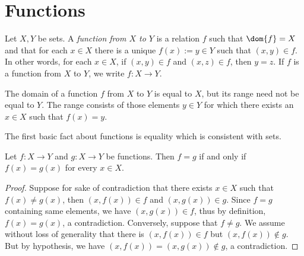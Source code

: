 \section{Functions}
\begin{comment}
\begin{definition}[Functions]
    Let $X, Y$ be sets, and let $P(x, y)$ be a property pertaining to an object $x \in X$ and an object $y \in Y$, such that for every $x \in X$, there is exactly one $y \in Y$ for which $P(x, y)$ is true. Then we define the \emph{function $f : X \to Y$ defined by $P$ on the domain $X$ and range $Y$} to be the object which, given any input $x \in X$, assigns an output $f(x) \in Y$, defined to be the unique object $f(x)$ for which $P(x, f(x))$ is true. Thus for any $x \in X$ and $y \in Y$,
    \begin{align*}
        y = f(x) \Longleftrightarrow P(x, y) \text{ is true}.
    \end{align*}
\end{definition}
\end{comment}

\begin{definition}[Functions]
    Let $X, Y$ be sets. A \emph{function from $X$ to $Y$} is a relation $f$ such that $\dom{f} = X$ and that for each $x \in X$ there is a unique $f(x) := y \in Y$ such that $(x, y) \in f$. In other words, for each $x \in X$, if $(x, y) \in f$ and $(x, z) \in f$, then $y = z$. If $f$ is a function from $X$ to $Y$, we write $f : X \to Y$.
\end{definition}

The domain of a function $f$ from $X$ to $Y$ is equal to $X$, but its range need not be equal to $Y$. The range consists of those elements $y \in Y$ for which there exists an $x \in X$ such that $f(x) = y$.

The first basic fact about functions is equality which is consistent with sets.

\begin{lemma}
    Let $f : X \to Y$ and $g : X \to Y$ be functions. Then $f = g$ if and only if $f(x) = g(x)$ for every $x \in X$.
\end{lemma}

\begin{proof}
    Suppose for sake of contradiction that there exists $x \in X$ such that $f(x) \neq g(x)$, then $(x, f(x)) \in f$ and $(x, g(x)) \in g$. Since $f = g$ containing same elements, we have $(x, g(x)) \in f$, thus by definition, $f(x) = g(x)$, a contradiction. Conversely, suppose that $f \neq g$. We assume without loss of generality that there is $(x, f(x)) \in f$ but $(x, f(x)) \notin g$. But by hypothesis, we have $(x, f(x)) = (x, g(x)) \notin g$, a contradiction.
\end{proof}

